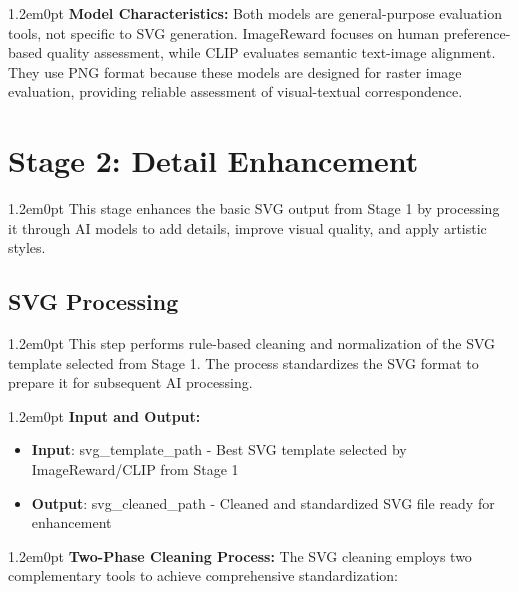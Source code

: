 \documentclass[10pt,a4paper]{article}
\newenvironment{bodytext}{\begin{adjustwidth}{1.2em}{0pt}}{\end{adjustwidth}}
\begin{document}
\begin{bodytext}
\textbf{Model Characteristics:} Both models are general-purpose evaluation tools, not specific to SVG generation. ImageReward focuses on human preference-based quality assessment, while CLIP evaluates semantic text-image alignment. They use PNG format because these models are designed for raster image evaluation, providing reliable assessment of visual-textual correspondence.
\end{bodytext}

\section{Stage 2: Detail Enhancement}

\begin{bodytext}
This stage enhances the basic SVG output from Stage 1 by processing it through AI models to add details, improve visual quality, and apply artistic styles.
\end{bodytext}

\subsection{SVG Processing}

\begin{bodytext}
This step performs rule-based cleaning and normalization of the SVG template selected from Stage 1. The process standardizes the SVG format to prepare it for subsequent AI processing.
\end{bodytext}

\begin{bodytext}
\textbf{Input and Output:}
\begin{itemize}
\item \textbf{Input}: svg\_template\_path - Best SVG template selected by ImageReward/CLIP from Stage 1
\item \textbf{Output}: svg\_cleaned\_path - Cleaned and standardized SVG file ready for enhancement
\end{itemize}
\end{bodytext}

\begin{bodytext}
\textbf{Two-Phase Cleaning Process:} The SVG cleaning employs two complementary tools to achieve comprehensive standardization:
\end{bodytext}
\end{document}
